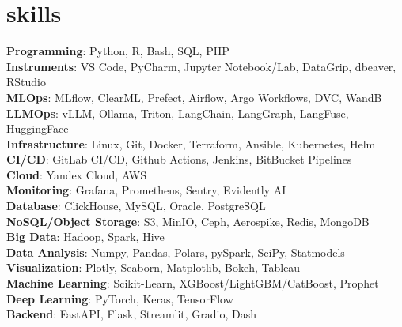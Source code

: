 \section{skills}
\begin{itemize}[leftmargin=0.15in, label={}]
  {\item{
        \textbf{Programming}{: Python, R, Bash, SQL, PHP} \\
        \textbf{Instruments}{: VS Code, PyCharm, Jupyter Notebook/Lab, DataGrip, dbeaver, RStudio} \\
        \textbf{MLOps}{: MLflow, ClearML, Prefect, Airflow, Argo Workflows, DVC, WandB} \\
        \textbf{LLMOps}{: vLLM, Ollama, Triton, LangChain, LangGraph, LangFuse, HuggingFace} \\
        \textbf{Infrastructure}{: Linux, Git, Docker, Terraform, Ansible, Kubernetes, Helm} \\
        \textbf{CI/CD}{: GitLab CI/CD, Github Actions, Jenkins, BitBucket Pipelines} \\
        \textbf{Cloud}{: Yandex Cloud, AWS} \\
        \textbf{Monitoring}{: Grafana, Prometheus, Sentry, Evidently AI} \\
        \textbf{Database}{: ClickHouse, MySQL, Oracle, PostgreSQL} \\
        \textbf{NoSQL/Object Storage}{: S3, MinIO, Ceph, Aerospike, Redis, MongoDB} \\
        \textbf{Big Data}{: Hadoop, Spark, Hive} \\
        \textbf{Data Analysis}{: Numpy, Pandas, Polars, pySpark, SciPy, Statmodels} \\
        \textbf{Visualization}{: Plotly, Seaborn, Matplotlib, Bokeh, Tableau} \\
        \textbf{Machine Learning}{: Scikit-Learn, XGBoost/LightGBM/CatBoost, Prophet} \\
        \textbf{Deep Learning}{: PyTorch, Keras, TensorFlow} \\
        \textbf{Backend}{: FastAPI, Flask, Streamlit, Gradio, Dash} \\
        }}
\end{itemize}
